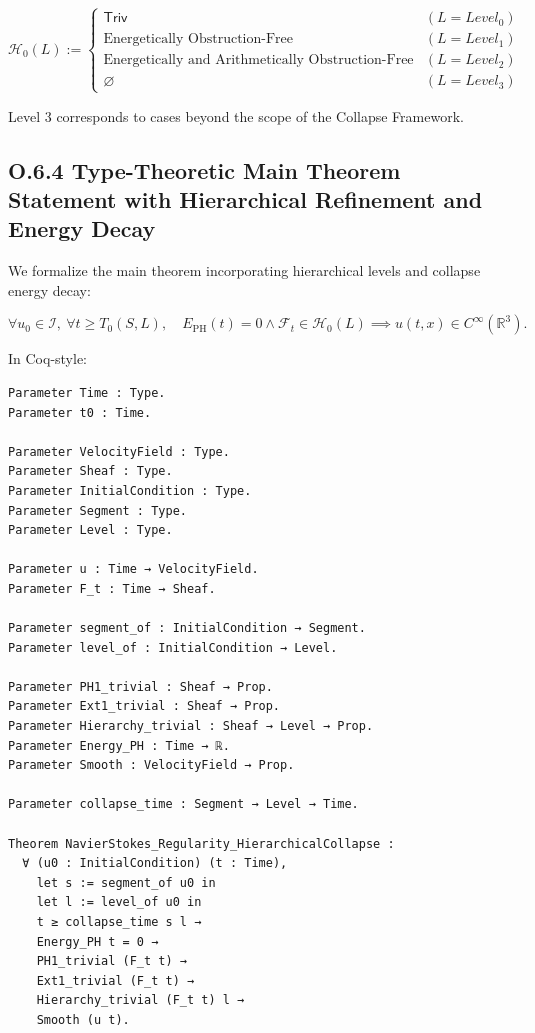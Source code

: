 \documentclass[11pt]{article}
\begin{document}
\[
\mathcal{H}_0(L) :=
\begin{cases}
\mathsf{Triv} & (L = Level_0) \\
\text{Energetically Obstruction-Free} & (L = Level_1) \\
\text{Energetically and Arithmetically Obstruction-Free} & (L = Level_2) \\
\varnothing & (L = Level_3)
\end{cases}
\]

Level 3 corresponds to cases beyond the scope of the Collapse Framework.

\subsection*{O.6.4 Type-Theoretic Main Theorem Statement with Hierarchical Refinement and Energy Decay}

We formalize the main theorem incorporating hierarchical levels and collapse energy decay:

\[
\forall u_0 \in \mathcal{I},\ \forall t \geq T_0(S, L),\quad
E_{\mathrm{PH}}(t) = 0 \land \mathcal{F}_t \in \mathcal{H}_0(L) \implies u(t, x) \in C^\infty(\mathbb{R}^3).
\]

In Coq-style:

\begin{lstlisting}[language=Coq]
Parameter Time : Type.
Parameter t0 : Time.

Parameter VelocityField : Type.
Parameter Sheaf : Type.
Parameter InitialCondition : Type.
Parameter Segment : Type.
Parameter Level : Type.

Parameter u : Time → VelocityField.
Parameter F_t : Time → Sheaf.

Parameter segment_of : InitialCondition → Segment.
Parameter level_of : InitialCondition → Level.

Parameter PH1_trivial : Sheaf → Prop.
Parameter Ext1_trivial : Sheaf → Prop.
Parameter Hierarchy_trivial : Sheaf → Level → Prop.
Parameter Energy_PH : Time → ℝ.
Parameter Smooth : VelocityField → Prop.

Parameter collapse_time : Segment → Level → Time.

Theorem NavierStokes_Regularity_HierarchicalCollapse :
  ∀ (u0 : InitialCondition) (t : Time),
    let s := segment_of u0 in
    let l := level_of u0 in
    t ≥ collapse_time s l →
    Energy_PH t = 0 →
    PH1_trivial (F_t t) →
    Ext1_trivial (F_t t) →
    Hierarchy_trivial (F_t t) l →
    Smooth (u t).
\end{lstlisting}
\end{document}
